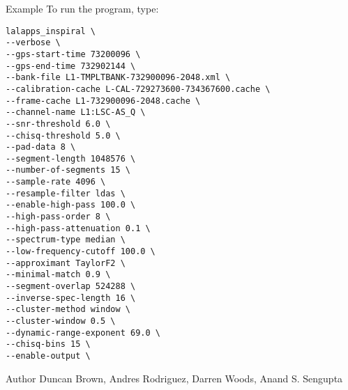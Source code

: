 \begin{entry}
\item[Example]
To run the program, type:
\begin{verbatim}
lalapps_inspiral \
--verbose \
--gps-start-time 73200096 \
--gps-end-time 732902144 \
--bank-file L1-TMPLTBANK-732900096-2048.xml \
--calibration-cache L-CAL-729273600-734367600.cache \ 
--frame-cache L1-732900096-2048.cache \
--channel-name L1:LSC-AS_Q \
--snr-threshold 6.0 \
--chisq-threshold 5.0 \
--pad-data 8 \
--segment-length 1048576 \
--number-of-segments 15 \
--sample-rate 4096 \
--resample-filter ldas \
--enable-high-pass 100.0 \ 
--high-pass-order 8 \
--high-pass-attenuation 0.1 \ 
--spectrum-type median \
--low-frequency-cutoff 100.0 \ 
--approximant TaylorF2 \
--minimal-match 0.9 \
--segment-overlap 524288 \
--inverse-spec-length 16 \
--cluster-method window \
--cluster-window 0.5 \
--dynamic-range-exponent 69.0 \ 
--chisq-bins 15 \
--enable-output \
\end{verbatim} 





\item[Author] Duncan Brown, Andres Rodriguez, Darren Woods, Anand S. Sengupta
\end{entry}
